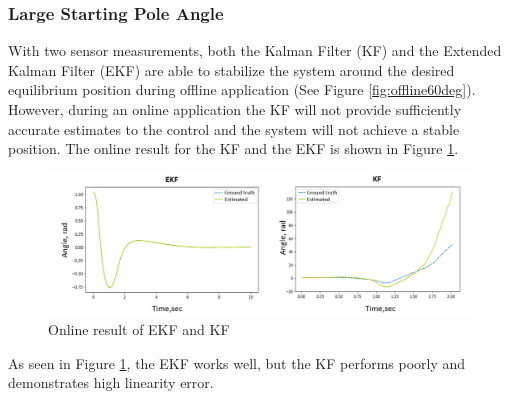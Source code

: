 \documentclass{article}
\begin{document}
\subsubsection{Large Starting Pole Angle} \label{ssec:LargeAngleOnline}
With two sensor measurements, both the Kalman Filter (KF) and the Extended Kalman Filter (EKF) are able to stabilize the system around the desired equilibrium position during offline application (See Figure \ref{fig:offline60deg}). However, during an online application the KF will not provide sufficiently accurate estimates to the control and the system will not achieve a stable position. The online result for the KF and the EKF is shown in Figure \ref{fig:onlineKFvsEKF}. 
\begin{figure}[h!]
	\centering
	\includegraphics[width=15cm,keepaspectratio]{EKFvsKF_online.png}
	\caption{Online result of EKF and KF}
	\label{fig:onlineKFvsEKF}
\end{figure}
As seen in Figure \ref{fig:onlineKFvsEKF}, the EKF works well, but the KF performs poorly and demonstrates high linearity error.
\end{document}

